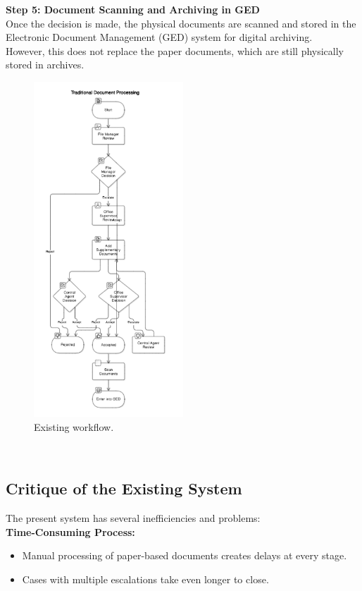 \textbf{ Step 5: Document Scanning and Archiving in GED}\\
Once the decision is made, the physical documents are scanned and stored in the Electronic Document Management (GED) system for digital archiving.\\
However, this does not replace the paper documents, which are still physically stored in archives.
\clearpage
\begin{figure}[h]
    \centering
    \includegraphics[width=0.5\textwidth]{figures/etude de l'existant.png} 
    \caption{Existing workflow.}
\end{figure} \

\subsection{Critique of the Existing System}
The present system has several inefficiencies and problems:\\
\textbf{ Time-Consuming Process:}
\begin{itemize}
    \item Manual processing of paper-based documents creates delays at every stage.
    \item Cases with multiple escalations take even longer to close.
\end{itemize}

